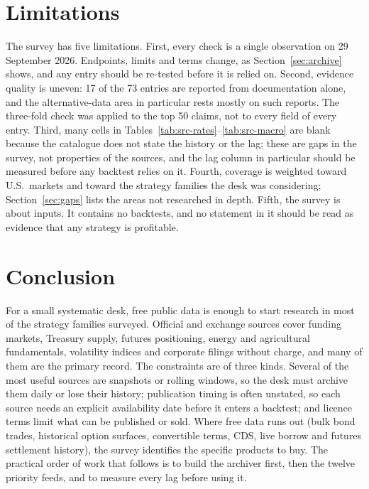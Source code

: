 \documentclass[10pt, a4paper, twocolumn]{article}
\begin{document}
\section{Limitations}
\label{sec:limits}

The survey has five limitations. First, every check is a single observation on 29 September 2026. Endpoints, limits and terms change, as Section~\ref{sec:archive} shows, and any entry should be re-tested before it is relied on. Second, evidence quality is uneven: 17 of the 73 entries are reported from documentation alone, and the alternative-data area in particular rests mostly on such reports. The three-fold check was applied to the top 50 claims, not to every field of every entry. Third, many cells in Tables~\ref{tab:src-rates}--\ref{tab:src-macro} are blank because the catalogue does not state the history or the lag; these are gaps in the survey, not properties of the sources, and the lag column in particular should be measured before any backtest relies on it. Fourth, coverage is weighted toward U.S.\ markets and toward the strategy families the desk was considering; Section~\ref{sec:gaps} lists the areas not researched in depth. Fifth, the survey is about inputs. It contains no backtests, and no statement in it should be read as evidence that any strategy is profitable.

\section{Conclusion}
\label{sec:conclusion}

For a small systematic desk, free public data is enough to start research in most of the strategy families surveyed. Official and exchange sources cover funding markets, Treasury supply, futures positioning, energy and agricultural fundamentals, volatility indices and corporate filings without charge, and many of them are the primary record. The constraints are of three kinds. Several of the most useful sources are snapshots or rolling windows, so the desk must archive them daily or lose their history; publication timing is often unstated, so each source needs an explicit availability date before it enters a backtest; and licence terms limit what can be published or sold. Where free data runs out (bulk bond trades, historical option surfaces, convertible terms, CDS, live borrow and futures settlement history), the survey identifies the specific products to buy. The practical order of work that follows is to build the archiver first, then the twelve priority feeds, and to measure every lag before using it.
\end{document}
